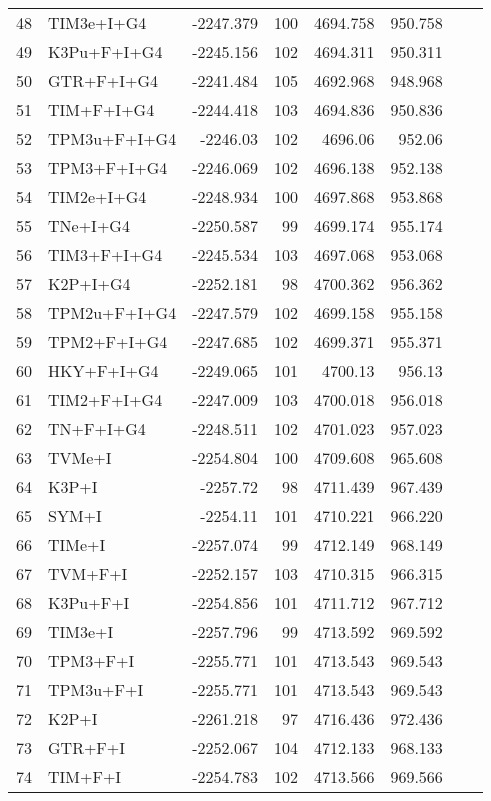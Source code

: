 \begin{longtable}{clrrrrrr}
	48 & TIM3e+I+G4 & -2247.379 & 100 & 4694.758 & 950.758 \\ 
	49 & K3Pu+F+I+G4 & -2245.156 & 102 & 4694.311 & 950.311 \\ 
	50 & GTR+F+I+G4 & -2241.484 & 105 & 4692.968 & 948.968 \\ 
	51 & TIM+F+I+G4 & -2244.418 & 103 & 4694.836 & 950.836 \\ 
	52 & TPM3u+F+I+G4 & -2246.03 & 102 & 4696.06 & 952.06 \\ 
	53 & TPM3+F+I+G4 & -2246.069 & 102 & 4696.138 & 952.138 \\ 
	54 & TIM2e+I+G4 & -2248.934 & 100 & 4697.868 & 953.868 \\ 
	55 & TNe+I+G4 & -2250.587 & 99 & 4699.174 & 955.174 \\ 
	56 & TIM3+F+I+G4 & -2245.534 & 103 & 4697.068 & 953.068 \\ 
	57 & K2P+I+G4 & -2252.181 & 98 & 4700.362 & 956.362 \\ 
	58 & TPM2u+F+I+G4 & -2247.579 & 102 & 4699.158 & 955.158 \\ 
	59 & TPM2+F+I+G4 & -2247.685 & 102 & 4699.371 & 955.371 \\ 
	60 & HKY+F+I+G4 & -2249.065 & 101 & 4700.13 & 956.13 \\ 
	61 & TIM2+F+I+G4 & -2247.009 & 103 & 4700.018 & 956.018 \\ 
	62 & TN+F+I+G4 & -2248.511 & 102 & 4701.023 & 957.023 \\ 
	63 & TVMe+I & -2254.804 & 100 & 4709.608 & 965.608 \\ 
	64 & K3P+I & -2257.72 & 98 & 4711.439 & 967.439 \\ 
	65 & SYM+I & -2254.11 & 101 & 4710.221 & 966.220 \\ 
	66 & TIMe+I & -2257.074 & 99 & 4712.149 & 968.149 \\ 
	67 & TVM+F+I & -2252.157 & 103 & 4710.315 & 966.315 \\ 
	68 & K3Pu+F+I & -2254.856 & 101 & 4711.712 & 967.712 \\ 
	69 & TIM3e+I & -2257.796 & 99 & 4713.592 & 969.592 \\ 
	70 & TPM3+F+I & -2255.771 & 101 & 4713.543 & 969.543 \\ 
	71 & TPM3u+F+I & -2255.771 & 101 & 4713.543 & 969.543 \\ 
	72 & K2P+I & -2261.218 & 97 & 4716.436 & 972.436 \\ 
	73 & GTR+F+I & -2252.067 & 104 & 4712.133 & 968.133 \\ 
	74 & TIM+F+I & -2254.783 & 102 & 4713.566 & 969.566 \\ 

\end{longtable}
